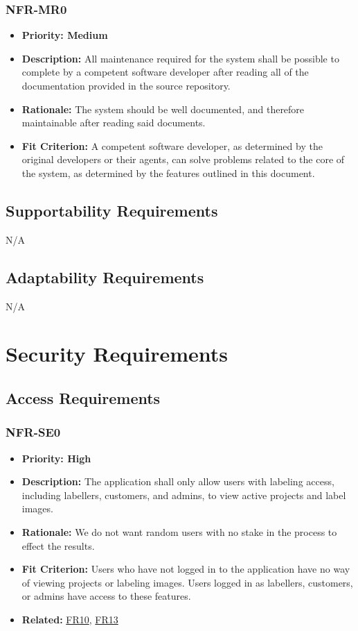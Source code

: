 \documentclass[12pt]{article}
\begin{document}
\subsubsection*{NFR-MR0}
\label{sec:MR0}
\begin{itemize}
  \item \textbf{Priority: Medium}
  \item \textbf{Description:} All maintenance required for the system shall be possible to complete by a competent software developer after reading all of the documentation provided in the source repository.
  \item \textbf{Rationale:} The system should be well documented, and therefore maintainable after reading said documents.
  \item \textbf{Fit Criterion:} A competent software developer, as determined by the original developers or their agents, can solve problems related to the core of the system, as determined by the 
  features outlined in this document.
\end{itemize}
\subsection{Supportability Requirements}
N/A
\subsection{Adaptability Requirements}
N/A

\section{Security Requirements}
\subsection{Access Requirements}
\subsubsection*{NFR-SE0}
\label{sec:SE0}
\begin{itemize}
  \item \textbf{Priority: High}
  \item \textbf{Description:} The application shall only allow users with labeling access, including labellers, customers, and admins, to view active projects and label images.
  \item \textbf{Rationale:} We do not want random users with no stake in the process to effect the results.
  \item \textbf{Fit Criterion:} Users who have not logged in to the application have no way of viewing projects or labeling images. Users logged in as labellers, customers, or admins have access to these features.
  \item \textbf{Related:} \hyperref[sec:FR10]{FR10}, \hyperref[sec:FR13]{FR13}
\end{itemize}
\end{document}
